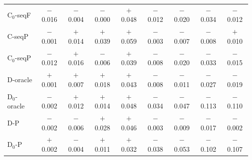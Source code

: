 \begin{table}[htbp]
\begin{tabular}{lcccc|cccc}
C$_0$-seqF & $-$0.016 & $-$0.004 & $-$0.000 & $+$0.048 & $-$0.012 & $-$0.020 & $-$0.034 & $-$0.012 \\
C-seqP & $-$0.001 & $+$0.014 & $+$0.039 & $+$0.059 & $-$0.003 & $-$0.007 & $-$0.008 & $+$0.010 \\
C$_0$-seqP & $-$0.012 & $+$0.016 & $-$0.006 & $+$0.039 & $-$0.008 & $-$0.020 & $-$0.033 & $-$0.015 \\
D-oracle & $+$0.001 & $+$0.007 & $+$0.018 & $+$0.043 & $-$0.008 & $-$0.011 & $-$0.027 & $-$0.019 \\
D$_0$-oracle & $-$0.002 & $+$0.012 & $+$0.014 & $+$0.048 & $-$0.034 & $-$0.047 & $-$0.113 & $-$0.110 \\
D-P & $-$0.002 & $-$0.006 & $+$0.028 & $+$0.046 & $-$0.003 & $-$0.009 & $-$0.017 & $-$0.002 \\
D$_0$-P & $+$0.002 & $-$0.004 & $+$0.011 & $+$0.032 & $-$0.038 & $-$0.053 & $-$0.102 & $-$0.107 \\
\bottomrule
\end{tabular}
\end{table}
